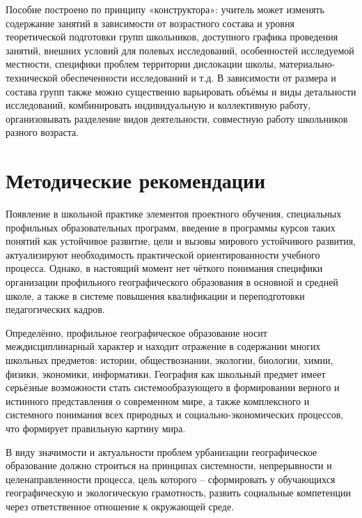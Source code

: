 \documentclass[
  11pt,
  russian,
]{book}
\begin{document}
Пособие построено по принципу «конструктора»: учитель может изменять
содержание занятий в зависимости от возрастного состава и уровня
теоретической подготовки групп школьников, доступного графика проведения
занятий, внешних условий для полевых исследований, особенностей
исследуемой местности, специфики проблем территории дислокации школы,
материально-технической обеспеченности исследований и т.д. В зависимости
от размера и состава групп также можно существенно варьировать объёмы и
виды детальности исследований, комбинировать индивидуальную и
коллективную работу, организовывать разделение видов деятельности,
совместную работу школьников разного возраста.

\hypertarget{ux43cux435ux442ux43eux434ux438ux447ux435ux441ux43aux438ux435-ux440ux435ux43aux43eux43cux435ux43dux434ux430ux446ux438ux438}{%
\section*{Методические
рекомендации}\label{ux43cux435ux442ux43eux434ux438ux447ux435ux441ux43aux438ux435-ux440ux435ux43aux43eux43cux435ux43dux434ux430ux446ux438ux438}}

Появление в школьной практике элементов проектного обучения, специальных
профильных образовательных программ, введение в программы курсов таких
понятий как устойчивое развитие, цели и вызовы мирового устойчивого
развития, актуализируют необходимость практической ориентированности
учебного процесса. Однако, в настоящий момент нет чёткого понимания
специфики организации профильного географического образования в основной
и средней школе, а также в системе повышения квалификации и
переподготовки педагогических кадров.

Определённо, профильное географическое образование носит
междисциплинарный характер и находит отражение в содержании многих
школьных предметов: истории, обществознании, экологии, биологии, химии,
физики, экономики, информатики. География как школьный предмет имеет
серьёзные возможности стать системообразующего в формировании верного и
истинного представления о современном мире, а также комплексного и
системного понимания всех природных и социально-экономических процессов,
что формирует правильную картину мира.

В виду значимости и актуальности проблем урбанизации географическое
образование должно строиться на принципах системности, непрерывности и
целенаправленности процесса, цель которого -- сформировать у обучающихся
географическую и экологическую грамотность, развить социальные
компетенции через ответственное отношение к окружающей среде.
\end{document}
